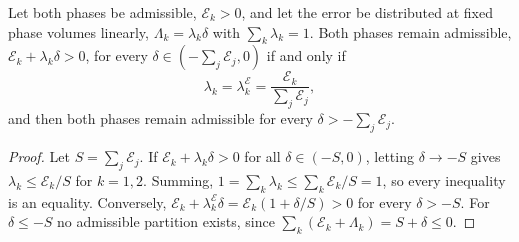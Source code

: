 \begin{proposition}\label{prop:lambdaE}
Let both phases be admissible, $\mathcal E_k>0$, and let the error be distributed at fixed phase volumes linearly,
$\Lambda_k=\lambda_k\delta$ with $\sum_k\lambda_k=1$. Both phases remain admissible, $\mathcal E_k+\lambda_k\delta>0$, for every $\delta\in(-\sum_j\mathcal E_j,0)$ if and only if
\begin{equation}
\lambda_k=\lambda^{\mathcal E}_k=\frac{\mathcal E_k}{\sum_j\mathcal E_j} ,
\label{eq:lambdaE}
\end{equation}
and then both phases remain admissible for every $\delta>-\sum_j\mathcal E_j$.
\end{proposition}
\begin{proof}
Let $S=\sum_j\mathcal E_j$. If $\mathcal E_k+\lambda_k\delta>0$ for all $\delta\in(-S,0)$, letting $\delta\to-S$ gives $\lambda_k\le \mathcal E_k/S$ for $k=1,2$. Summing,
$1=\sum_k\lambda_k\le\sum_k\mathcal E_k/S=1$, so every inequality is an equality. Conversely, $\mathcal E_k+\lambda^{\mathcal E}_k\delta=\mathcal E_k(1+\delta/S)>0$ for every $\delta>-S$.
For $\delta\le-S$ no admissible partition exists, since $\sum_k(\mathcal E_k+\Lambda_k)=S+\delta\le0$.
\end{proof}

